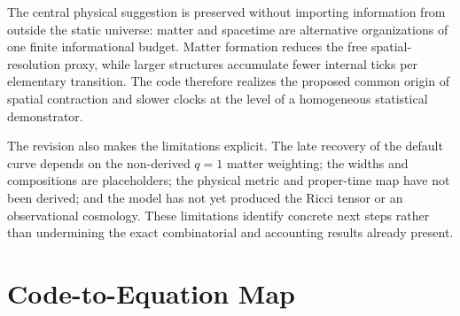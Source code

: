\documentclass[11pt]{article}
\begin{document}
The central physical suggestion is preserved without importing information
from outside the static universe: matter and spacetime are alternative
organizations of one finite informational budget.  Matter formation reduces
the free spatial-resolution proxy, while larger structures accumulate fewer
internal ticks per elementary transition.  The code therefore realizes the
proposed common origin of spatial contraction and slower clocks at the level
of a homogeneous statistical demonstrator.

The revision also makes the limitations explicit.  The late recovery of the
default curve depends on the non-derived $q=1$ matter weighting; the widths
and compositions are placeholders; the physical metric and proper-time map
have not been derived; and the model has not yet produced the Ricci tensor or
an observational cosmology.  These limitations identify concrete next
steps rather than undermining the exact combinatorial and accounting results
already present.

\appendix
\section{Code-to-Equation Map}
\label{app:code-map}
\end{document}
